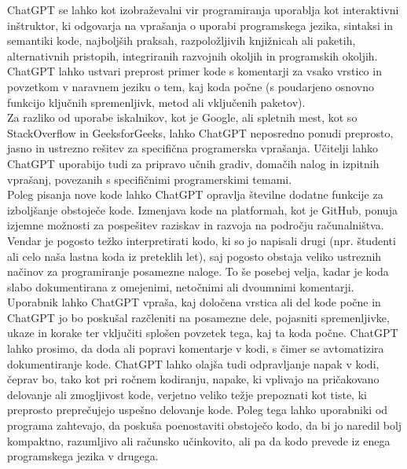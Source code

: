 \documentclass[a4paper,12pt,openright]{book}
\begin{document}
ChatGPT se lahko kot izobraževalni vir programiranja uporablja kot interaktivni inštruktor, ki odgovarja na vprašanja o uporabi programskega jezika, sintaksi in semantiki kode, najboljših praksah, razpoložljivih knjižnicah ali paketih, alternativnih pristopih, integriranih razvojnih okoljih in programskih okoljih. ChatGPT lahko ustvari preprost primer kode s komentarji za vsako vrstico in povzetkom v naravnem jeziku o tem, kaj koda počne (s poudarjeno osnovno funkcijo ključnih spremenljivk, metod ali vključenih paketov). \cite{openai_chatgpt} \\
Za razliko od uporabe iskalnikov, kot je Google, ali spletnih mest, kot so StackOverflow in GeeksforGeeks, lahko ChatGPT neposredno ponudi preprosto, jasno in ustrezno rešitev za specifična programerska vprašanja. Učitelji lahko ChatGPT uporabijo tudi za pripravo učnih gradiv, domačih nalog in izpitnih vprašanj, povezanih s specifičnimi programerskimi temami. \cite{Meyer2023} \\
Poleg pisanja nove kode lahko ChatGPT opravlja številne dodatne funkcije za izboljšanje obstoječe kode. Izmenjava kode na platformah, kot je GitHub, ponuja izjemne možnosti za pospešitev raziskav in razvoja na področju računalništva. Vendar je pogosto težko interpretirati kodo, ki so jo napisali drugi (npr. študenti ali celo naša lastna koda iz preteklih let), saj pogosto obstaja veliko ustreznih načinov za programiranje posamezne naloge. To še posebej velja, kadar je koda slabo dokumentirana z omejenimi, netočnimi ali dvoumnimi komentarji. Uporabnik lahko ChatGPT vpraša, kaj določena vrstica ali del kode počne in ChatGPT jo bo poskušal razčleniti na posamezne dele, pojasniti spremenljivke, ukaze in korake ter vključiti splošen povzetek tega, kaj ta koda počne. ChatGPT lahko prosimo, da doda ali popravi komentarje v kodi, s čimer se avtomatizira dokumentiranje kode. ChatGPT lahko olajša tudi odpravljanje napak v kodi, čeprav bo, tako kot pri ročnem kodiranju, napake, ki vplivajo na pričakovano delovanje ali zmogljivost kode, verjetno veliko težje prepoznati kot tiste, ki preprosto preprečujejo uspešno delovanje kode. Poleg tega lahko uporabniki od programa zahtevajo, da poskuša poenostaviti obstoječo kodo, da bi jo naredil bolj kompaktno, razumljivo ali računsko učinkovito, ali pa da kodo prevede iz enega programskega jezika v drugega. \cite{Meyer2023}
\end{document}
